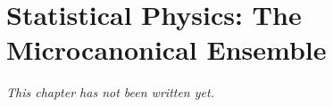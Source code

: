 \chapter{Statistical Physics: The Microcanonical Ensemble}\label{ch:b3:microcanonical-ensemble}


\emph{This chapter has not been written yet.}
